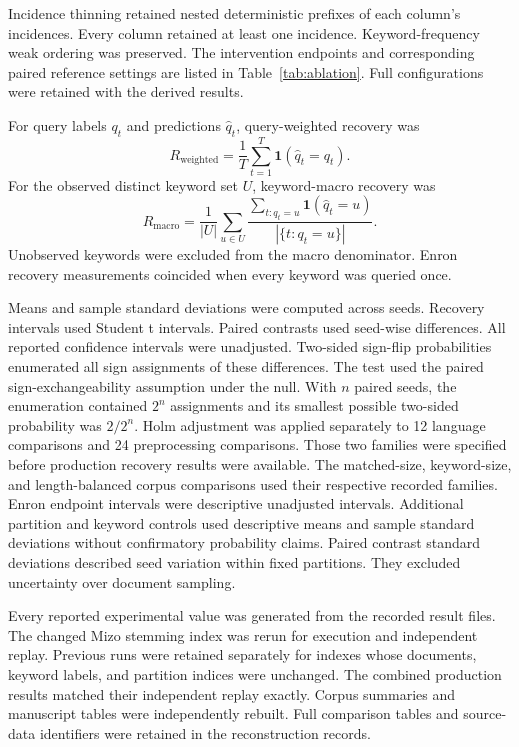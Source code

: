 \documentclass[pdflatex,sn-mathphys-num]{sn-jnl}%
\theoremstyle{thmstyleone}%
\theoremstyle{thmstyletwo}%
\theoremstyle{thmstylethree}%
\newcommand{\LanguageFamily}{12}
\newcommand{\PreprocessingFamily}{24}
\begin{document}
Incidence thinning retained nested deterministic prefixes of each column's incidences. Every column retained at least one incidence. Keyword-frequency weak ordering was preserved. The intervention endpoints and corresponding paired reference settings are listed in Table~\ref{tab:ablation}. Full configurations were retained with the derived results.

For query labels $q_t$ and predictions $\hat q_t$, query-weighted recovery was
\[
R_{\mathrm{weighted}}=\frac{1}{T}\sum_{t=1}^{T}\mathbf{1}(\hat q_t=q_t).
\]
For the observed distinct keyword set $U$, keyword-macro recovery was
\[
R_{\mathrm{macro}}=\frac{1}{|U|}\sum_{u\in U}
\frac{\sum_{t:q_t=u}\mathbf{1}(\hat q_t=u)}{|\{t:q_t=u\}|}.
\]
Unobserved keywords were excluded from the macro denominator. Enron recovery measurements coincided when every keyword was queried once.

Means and sample standard deviations were computed across seeds. Recovery intervals used Student t intervals. Paired contrasts used seed-wise differences. All reported confidence intervals were unadjusted. Two-sided sign-flip probabilities enumerated all sign assignments of these differences. The test used the paired sign-exchangeability assumption under the null. With $n$ paired seeds, the enumeration contained $2^n$ assignments and its smallest possible two-sided probability was $2/2^n$. Holm adjustment was applied separately to \LanguageFamily{} language comparisons and \PreprocessingFamily{} preprocessing comparisons. Those two families were specified before production recovery results were available. The matched-size, keyword-size, and length-balanced corpus comparisons used their respective recorded families. Enron endpoint intervals were descriptive unadjusted intervals. Additional partition and keyword controls used descriptive means and sample standard deviations without confirmatory probability claims. Paired contrast standard deviations described seed variation within fixed partitions. They excluded uncertainty over document sampling.

Every reported experimental value was generated from the recorded result files. The changed Mizo stemming index was rerun for execution and independent replay. Previous runs were retained separately for indexes whose documents, keyword labels, and partition indices were unchanged. The combined production results matched their independent replay exactly. Corpus summaries and manuscript tables were independently rebuilt. Full comparison tables and source-data identifiers were retained in the reconstruction records.
\end{document}
